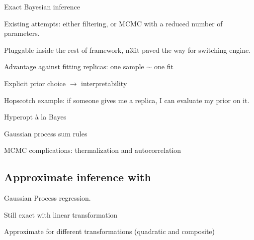 
Exact Bayesian inference

Existing attempts: either filtering, or MCMC with a reduced number of
parameters.

Pluggable inside the rest of \nnpdf framework, n3fit paved the way for
switching engine.

Advantage against fitting replicas: one sample $\sim$ one fit

Explicit prior choice $\to$ interpretability

Hopscotch example: if someone gives me a replica, I can evaluate my prior on it.

Hyperopt à la Bayes

Gaussian process sum rules

MCMC complications: thermalization and autocorrelation

\subsection{Approximate inference with \lsqfitgp}

Gaussian Process regression.

Still exact with linear transformation

Approximate for different transformations (quadratic and composite)
